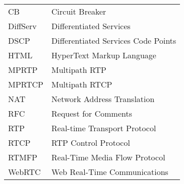 \begin{longtable}{ll}
CB		& Circuit Breaker \\
DiffServ	& Differentiated Services \\
DSCP 	& Differentiated Services Code Points \\
HTML	& HyperText Markup Language \\
MPRTP 	& Multipath RTP \\
MPRTCP 	& Multipath RTCP \\
NAT		& Network Address Translation \\
RFC 	& Request for Comments \\
RTP 	& Real-time Transport Protocol \\
RTCP 	& RTP Control Protocol \\
RTMFP	& Real-Time Media Flow Protocol \\
WebRTC 	& Web Real-Time Communications \\
\end{longtable}
